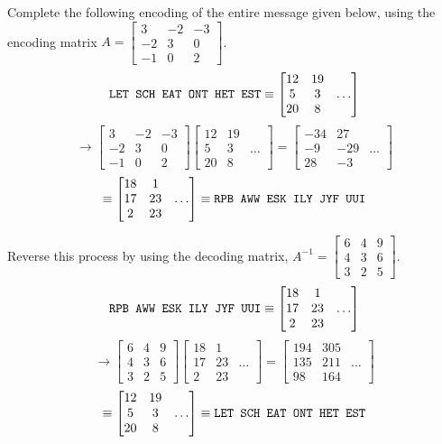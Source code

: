 \begin{applicationActivities}
\begin{activity}{10}
Complete the following encoding of the entire message given below,
using the encoding matrix \(A=\begin{bmatrix}3&-2&-3\\-2&3&0\\-1&0&2\end{bmatrix}\).
\[
\text{\texttt{LET SCH EAT ONT HET EST}}
\equiv
\begin{bmatrix}12&19\\5&3&\dots\\20&8\end{bmatrix}
\]
\[
\to
\begin{bmatrix}3&-2&-3\\-2&3&0\\-1&0&2\end{bmatrix}\begin{bmatrix}12&19\\5&3&\dots\\20&8\end{bmatrix}=
\begin{bmatrix}-34&27\\-9&-29&\dots\\28&-3\end{bmatrix}
\]
\[
\equiv
\begin{bmatrix}18&1\\17&23&\dots\\2&23\end{bmatrix}
\equiv
\text{\texttt{RPB AWW ESK ILY JYF UUI}}
\]
\end{activity}

\begin{activity}{10}
Reverse this process by using the decoding matrix,
\(A^{-1}=\begin{bmatrix}6&4&9\\4&3&6\\3&2&5\end{bmatrix}\).
\[
\text{\texttt{RPB AWW ESK ILY JYF UUI}}
\equiv
\begin{bmatrix}18&1\\17&23&\dots\\2&23\end{bmatrix}
\]
\[
\to
\begin{bmatrix}6&4&9\\4&3&6\\3&2&5\end{bmatrix}\begin{bmatrix}18&1\\17&23&\dots\\2&23\end{bmatrix}
=
\begin{bmatrix}194&305\\135&211&\dots\\98&164\end{bmatrix}
\]
\[
\equiv
\begin{bmatrix}12&19\\5&3&\dots\\20&8\end{bmatrix}
\equiv
\text{\texttt{LET SCH EAT ONT HET EST}}
\]
\end{activity}
\end{applicationActivities}
